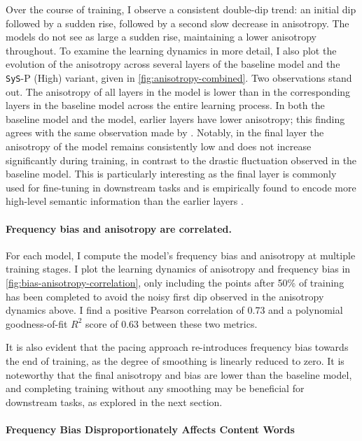 Over the course of training, I observe a consistent double-dip trend: an initial dip followed by a sudden rise, followed by a second slow decrease in anisotropy. The \smoothing models do not see as large a sudden rise, maintaining a lower anisotropy throughout. To examine the learning dynamics in more detail, I also plot the evolution of the anisotropy across several layers of the baseline model and the \texttt{SyS}-P (High) variant, given in \cref{fig:anisotropy-combined}. Two observations stand out. The anisotropy of all layers in the \smoothing model is lower than in the corresponding layers in the baseline model across the entire learning process. In both the baseline model and the \smoothing model, earlier layers have lower anisotropy; this finding agrees with the same observation made by \citet{ethayarajh2019contextual}. Notably, in the final layer the anisotropy of the \smoothing model remains consistently low and does not increase significantly during training, in contrast to the drastic fluctuation observed in the baseline model. This is particularly interesting as the final layer is commonly used for fine-tuning in downstream tasks and is empirically found to encode more high-level semantic information than the earlier layers \citep{clark2019does}. 

\paragraph{Frequency bias and anisotropy are correlated.}

For each model, I compute the model's frequency bias and anisotropy at multiple training stages. I plot the learning dynamics of anisotropy and frequency bias in \cref{fig:bias-anisotropy-correlation}, only including the points after 50\% of training has been completed to avoid the noisy first dip observed in the anisotropy dynamics above. I find a positive Pearson correlation of 0.73 and a polynomial goodness-of-fit $R^2$ score of 0.63 between these two metrics.

It is also evident that the pacing approach re-introduces frequency bias towards the end of training, as the degree of smoothing is linearly reduced to zero. It is noteworthy that the final anisotropy and bias are lower than the baseline model, and completing training without any smoothing may be beneficial for downstream tasks, as explored in the next section.

\paragraph{Frequency Bias Disproportionately Affects Content Words}
\label{sec:word-class-versus-word-frequency}



